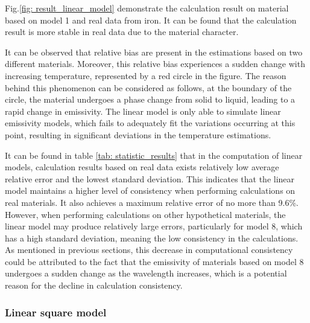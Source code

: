 Fig.\ref{fig: result_linear_model} demonstrate the calculation result on material based on 
model 1 and real data from iron. It can be found that the calculation result is more
stable in real data due to the material character. 


It can be observed that relative bias are present 
in the estimations based on two different materials. Moreover, this relative bias 
experiences a sudden change with increasing temperature, represented by a red 
circle in the figure. The reason behind this phenomenon can be considered as follows, 
at the boundary of the circle, the material undergoes a phase change from solid to liquid, 
leading to a rapid change in emissivity. The linear model is only able to  
simulate linear emissivity models, which fails to adequately fit the variations 
occurring at this point, resulting in significant deviations in the 
temperature estimations.


It can be found in table \ref{tab: statistic_results} that in the computation of linear models, 
calculation results based on real data exists relatively low average relative error and the lowest 
standard deviation. This indicates that the linear model maintains a higher 
level of consistency when performing calculations on real materials. It also 
achieves a maximum relative error of no more than 9.6\%. However, when 
performing calculations on other hypothetical materials, the linear model may 
produce relatively large errors, particularly for model 8, which has a high standard 
deviation, meaning the low consistency in the calculations. As mentioned 
in previous sections, this decrease in computational consistency could be attributed to the 
fact that the emissivity of materials based on model 8 undergoes a sudden change 
as the wavelength increases, which is a potential reason for the decline in 
calculation consistency.


\subsubsection{Linear square model}

